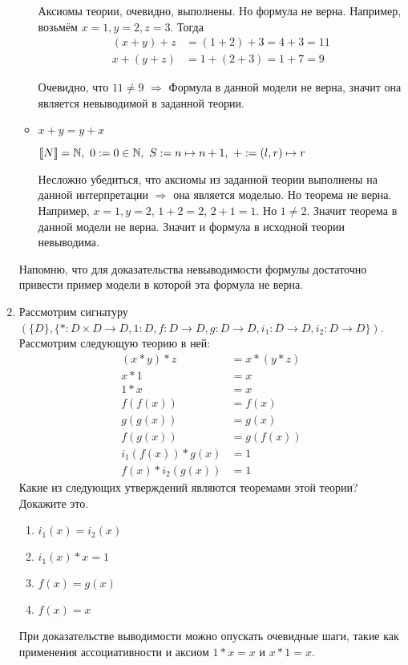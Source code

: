 \begin{enumerate}
\begin{itemize}
Аксиомы теории, очевидно, выполнены. Но формула не верна. Например, возьмём $x = 1, y = 2, z = 3$. Тогда
\begin{align*}
(x + y) + z &= (1 + 2) + 3 = 4 + 3 = 11 \\
x + (y + z) &= 1 + (2 + 3) = 1 + 7 = 9
\end{align*} 

Очевидно, что $11 \neq 9$ $\Rightarrow$ Формула в данной модели не верна, значит она является невыводимой в заданной теории.

\item $x + y = y + x$

$\llb N \rrb = \mathbb{N}, \
0 := 0 \in \mathbb{N},\
S := n \mapsto n + 1, \ 
+ := (l, r) \mapsto r$

Несложно убедиться, что аксиомы из заданной теории выполнены на данной интерпретации $\Rightarrow$ она является 
моделью. Но теорема не верна. Например, $x = 1, y = 2$, $1 + 2 = 2$, $2 + 1 = 1$. Но $1 \neq 2$. Значит теорема в 
данной модели не верна. Значит и формула в исходной теории невыводима.

\end{itemize}
Напомню, что для доказательства невыводимости формулы достаточно привести пример модели в которой эта формула не 
верна.

\item Рассмотрим сигнатуру $(\{D\}, \{ * : D \times D \to D, 1 : D, f : D \to D, g : D \to D, i_1 : D \to D, i_2 : D \to D \})$.
    Рассмотрим следующую теорию в ней:
\begin{align*}
(x * y) * z & = x * (y * z) \\
x * 1 & = x \\
1 * x & = x \\
f(f(x)) & = f(x) \\
g(g(x)) & = g(x) \\
f(g(x)) & = g(f(x)) \\
i_1(f(x)) * g(x) & = 1 \\
f(x) * i_2(g(x)) & = 1
\end{align*}
Какие из следующих утверждений являются теоремами этой теории? Докажите это.
\begin{enumerate}
\item $i_1(x) = i_2(x)$
\item $i_1(x) * x = 1$
\item $f(x) = g(x)$
\item $f(x) = x$
\end{enumerate}
При доказательстве выводимости можно опускать очевидные шаги, такие как применения ассоциативности и аксиом $1 * 
x = x$ и $x * 1 = x$.


\end{enumerate}
